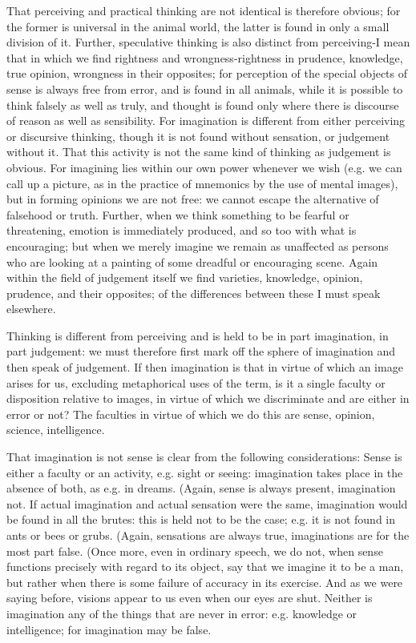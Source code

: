 That perceiving and practical thinking are not identical is therefore
obvious; for the former is universal in the animal world, the latter
is found in only a small division of it. Further, speculative thinking
is also distinct from perceiving-I mean that in which we find rightness
and wrongness-rightness in prudence, knowledge, true opinion, wrongness
in their opposites; for perception of the special objects of sense
is always free from error, and is found in all animals, while it is
possible to think falsely as well as truly, and thought is found only
where there is discourse of reason as well as sensibility. For imagination
is different from either perceiving or discursive thinking, though
it is not found without sensation, or judgement without it. That this
activity is not the same kind of thinking as judgement is obvious.
For imagining lies within our own power whenever we wish (e.g. we
can call up a picture, as in the practice of mnemonics by the use
of mental images), but in forming opinions we are not free: we cannot
escape the alternative of falsehood or truth. Further, when we think
something to be fearful or threatening, emotion is immediately produced,
and so too with what is encouraging; but when we merely imagine we
remain as unaffected as persons who are looking at a painting of some
dreadful or encouraging scene. Again within the field of judgement
itself we find varieties, knowledge, opinion, prudence, and their
opposites; of the differences between these I must speak elsewhere.

Thinking is different from perceiving and is held to be in part imagination,
in part judgement: we must therefore first mark off the sphere of
imagination and then speak of judgement. If then imagination is that
in virtue of which an image arises for us, excluding metaphorical
uses of the term, is it a single faculty or disposition relative to
images, in virtue of which we discriminate and are either in error
or not? The faculties in virtue of which we do this are sense, opinion,
science, intelligence. 

That imagination is not sense is clear from the following considerations:
Sense is either a faculty or an activity, e.g. sight or seeing: imagination
takes place in the absence of both, as e.g. in dreams. (Again, sense
is always present, imagination not. If actual imagination and actual
sensation were the same, imagination would be found in all the brutes:
this is held not to be the case; e.g. it is not found in ants or bees
or grubs. (Again, sensations are always true, imaginations are for
the most part false. (Once more, even in ordinary speech, we do not,
when sense functions precisely with regard to its object, say that
we imagine it to be a man, but rather when there is some failure of
accuracy in its exercise. And as we were saying before, visions appear
to us even when our eyes are shut. Neither is imagination any of the
things that are never in error: e.g. knowledge or intelligence; for
imagination may be false. 

